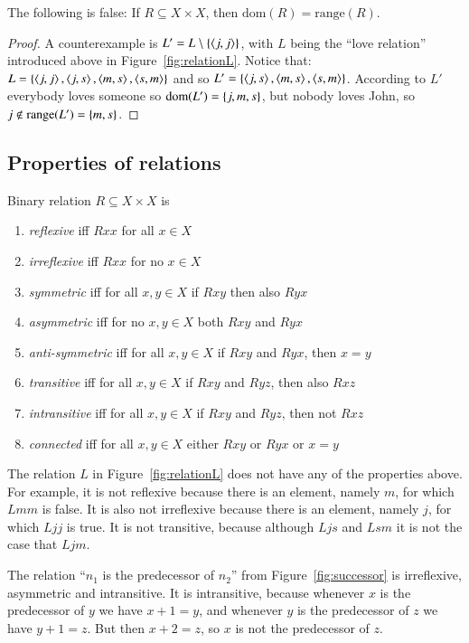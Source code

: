 \documentclass[nobib,nofonts]{tufte-handout}
\begin{document}
\begin{claim}
  The following is false: If $R \subseteq X \times X$, then $\text{dom}(R) = \text{range}(R)$.
\end{claim}

\begin{proof}
A counterexample is $L' = L \setminus \left\{\left \langle j,j\right\rangle\right\}$, with $L$ being the ``love relation'' introduced
above in Figure~\ref{fig:relationL}. Notice that: $L = \left\{\left \langle j,j\right\rangle, \left \langle j,s\right\rangle,
  \left \langle m,s\right\rangle, \left \langle s,m\right\rangle\right\}$ and so $L' = \left\{\left \langle j,s\right\rangle, \left \langle m,s\right\rangle,
  \left \langle s,m\right\rangle\right\}$. According to $L'$ everybody loves someone so $\text{dom}(L') = \left\{j,m,s\right\}$,
but nobody loves John, so $j \not \in \text{range}(L') = \left\{m,s\right\}$.
\end{proof}


\subsection{Properties of relations}

Binary relation $R \subseteq X \times X$ is
\begin{enumerate}
\item[] \emph{reflexive} iff $Rxx$ for all $x \in X$
\item[] \emph{irreflexive} iff $Rxx$ for no $x \in X$
\item[] \emph{symmetric} iff for all $x,y \in X$ if $Rxy$ then also $Ryx$
\item[] \emph{asymmetric} iff for no $x,y \in X$ both $Rxy$ and $Ryx$
\item[] \emph{anti-symmetric} iff for all $x,y \in X$ if $Rxy$ and $Ryx$, then $x = y$
\item[] \emph{transitive} iff for all $x,y \in X$ if $Rxy$ and $Ryz$, then also $Rxz$
\item[] \emph{intransitive} iff for all $x,y \in X$ if $Rxy$ and $Ryz$, then not $Rxz$
\item[] \emph{connected} iff for all $x,y \in X$ either $Rxy$ or $Ryx$ or $x = y$
\end{enumerate}

The relation $L$ in Figure~\ref{fig:relationL} does not have any of the properties above.
For example, it is not reflexive because there is an element, namely $m$, for which $Lmm$ is false.
It is also not irreflexive because there is an element, namely $j$, for which $Ljj$ is true.
It is not transitive, because although $Ljs$ and $Lsm$ it is not the case that $Ljm$.

The relation ``$n_1$ is the predecessor of $n_2$'' from Figure~\ref{fig:successor} is
irreflexive, asymmetric and intransitive. It is intransitive, because whenever $x$ is the
predecessor of $y$ we have $x + 1= y$, and whenever $y$ is the predecessor of $z$ we have
$y + 1 = z$. But then $x + 2= z$, so $x$ is not the predecessor of $z$.
\end{document}

